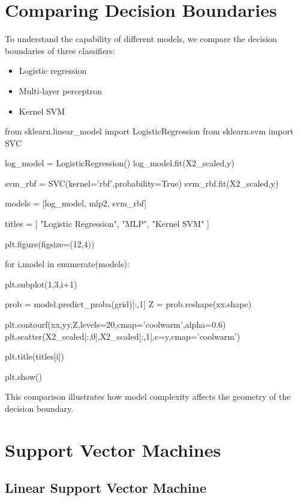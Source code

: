 \documentclass[12pt]{article}
\begin{document}
\section{Comparing Decision Boundaries}

To understand the capability of different models, we compare the decision boundaries of three classifiers:

\begin{itemize}
\item Logistic regression
\item Multi-layer perceptron
\item Kernel SVM
\end{itemize}

\begin{py-box}
from sklearn.linear_model import LogisticRegression
from sklearn.svm import SVC

log_model = LogisticRegression()
log_model.fit(X2_scaled,y)

svm_rbf = SVC(kernel='rbf',probability=True)
svm_rbf.fit(X2_scaled,y)
\end{py-box}

\begin{py-box}
models = [log_model, mlp2, svm_rbf]

titles = [
"Logistic Regression",
"MLP",
"Kernel SVM"
]

plt.figure(figsize=(12,4))

for i,model in enumerate(models):

    plt.subplot(1,3,i+1)

    prob = model.predict_proba(grid)[:,1]
    Z = prob.reshape(xx.shape)

    plt.contourf(xx,yy,Z,levels=20,cmap='coolwarm',alpha=0.6)
    plt.scatter(X2_scaled[:,0],X2_scaled[:,1],c=y,cmap='coolwarm')

    plt.title(titles[i])

plt.show()
\end{py-box}

This comparison illustrates how model complexity affects the geometry of the decision boundary.

\section{Support Vector Machines}

\subsection{Linear Support Vector Machine}
\end{document}
